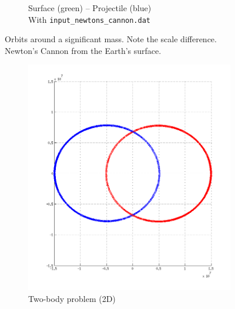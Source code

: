 \documentclass{article}
\begin{document}
\begin{figure}[H]
\begin{subfigure}[b]{0.3\textwidth}
                \caption{Surface (green) -- Projectile (blue)\\With \texttt{input\_newtons\_cannon.dat}}
                \label{fig:nc}
        \end{subfigure}
        \caption{Orbits around a significant mass. Note the scale difference.\\Newton's Cannon from the Earth's surface.}\label{fig:orbits}
\end{figure}

\begin{figure}[H]
        \centering
        \begin{subfigure}[b]{0.3\textwidth}
                \centering
                \includegraphics[width=\textwidth]{img/binary_xy}
                \caption{Two-body problem (2D)}
                \label{fig:bin}
        \end{subfigure}%
        ~ %
        \begin{subfigure}[b]{0.3\textwidth}
                \centering

\end{subfigure}
\end{figure}
\end{document}
